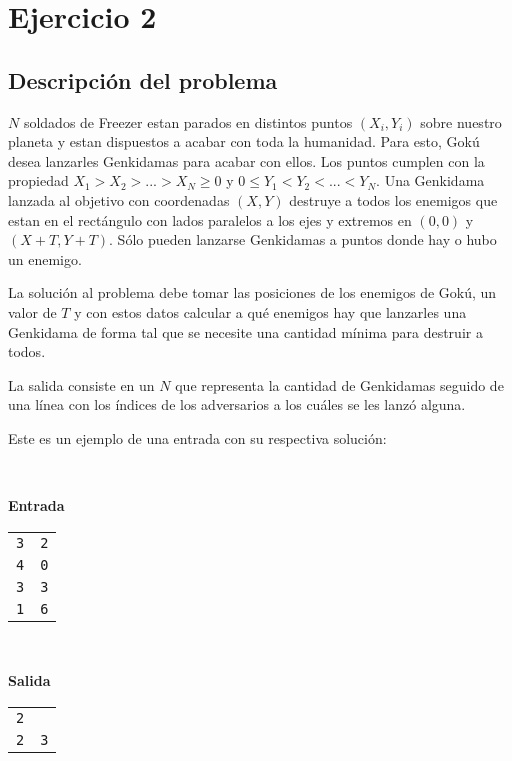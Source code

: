 
\section{Ejercicio 2}
	\subsection{Descripción del problema}

	$N$ soldados de Freezer estan parados en distintos puntos $(X_i,Y_i)$ sobre
	nuestro planeta y estan dispuestos a acabar con toda la humanidad. Para
	esto, Gokú desea lanzarles Genkidamas para acabar con ellos. Los puntos
	cumplen con la propiedad $ X_1 > X_2 >. . . > X_N \geq 0 $ y $ 0 \leq Y_1 <
	Y_2 < . . . < Y_N$. Una Genkidama lanzada al objetivo con coordenadas $(X,Y)$
	destruye a todos los enemigos que estan en el rectángulo con lados paralelos
	a los ejes y extremos en $(0, 0)$ y $(X + T, Y + T )$. Sólo pueden lanzarse
	Genkidamas a puntos donde hay o hubo un enemigo. 

	La solución al problema debe tomar las posiciones de los enemigos de
	Gokú, un valor de $T$ y con estos datos calcular a qué enemigos hay que
	lanzarles una Genkidama de forma tal que se necesite una cantidad mínima
	para destruir a todos.

	La salida consiste en un $N$ que representa la cantidad de Genkidamas
	seguido de una línea con los índices de los adversarios a los cuáles se
	les lanzó alguna.

	Este es un ejemplo de una entrada con su respectiva
	solución:

	~

	\textbf{Entrada}

	\begin{tabular}{ll}
		\texttt{3} & \texttt{2} \\
		\texttt{4} & \texttt{0} \\
		\texttt{3} & \texttt{3} \\
		\texttt{1} & \texttt{6} \\
	\end{tabular}

	~

	\textbf{Salida}

	\begin{tabular}{ll}
		\texttt{2} & \\
		\texttt{2} & \texttt{3} \\
	\end{tabular}

